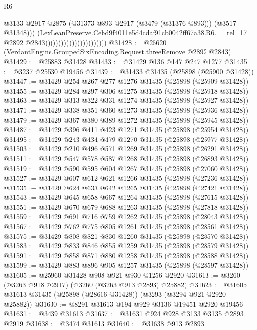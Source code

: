 \begin{lexlean}{R6}
\begin{coremodule}
                                                    @3133
                                                    @2917
                                                    @2875
                                                    (@31373 @893 @2917 (@3479 (@31376 @893)))
                                                    (@3517 @31348)))
                                                (LexLeanPreserve.Cebd9f4011e5d4cdaf91cb0042ff67a38.R6.__rel_17
                                                  @2892
                                                  @2843)))))))))))))))))))))))
@31428 := @25620 (VerdantEngine.GroupedSixEncoding.Request.threeRemove @2892 @2843)
@31429 := @25883 @31428
@31433 := @31429 @136 @147 @247 @1277
@31435 := @3237 @25530 @19456
@31439 := @31433 @31435 (@25898 (@25900 @31428))
@31447 := @31429 @254 @267 @277 @1276 @31435 (@25898 (@25909 @31428))
@31455 := @31429 @284 @297 @306 @1275 @31435 (@25898 (@25918 @31428))
@31463 := @31429 @313 @322 @331 @1274 @31435 (@25898 (@25927 @31428))
@31471 := @31429 @338 @351 @360 @1273 @31435 (@25898 (@25936 @31428))
@31479 := @31429 @367 @380 @389 @1272 @31435 (@25898 (@25945 @31428))
@31487 := @31429 @396 @411 @423 @1271 @31435 (@25898 (@25954 @31428))
@31495 := @31429 @243 @434 @479 @1270 @31435 (@25898 (@25977 @31428))
@31503 := @31429 @210 @496 @571 @1269 @31435 (@25898 (@26291 @31428))
@31511 := @31429 @547 @578 @587 @1268 @31435 (@25898 (@26893 @31428))
@31519 := @31429 @590 @595 @604 @1267 @31435 (@25898 (@27060 @31428))
@31527 := @31429 @607 @612 @621 @1266 @31435 (@25898 (@27236 @31428))
@31535 := @31429 @624 @633 @642 @1265 @31435 (@25898 (@27421 @31428))
@31543 := @31429 @645 @658 @667 @1264 @31435 (@25898 (@27615 @31428))
@31551 := @31429 @670 @679 @688 @1263 @31435 (@25898 (@27818 @31428))
@31559 := @31429 @691 @716 @759 @1262 @31435 (@25898 (@28043 @31428))
@31567 := @31429 @762 @775 @805 @1261 @31435 (@25898 (@28561 @31428))
@31575 := @31429 @808 @821 @830 @1260 @31435 (@25898 (@28570 @31428))
@31583 := @31429 @833 @846 @855 @1259 @31435 (@25898 (@28579 @31428))
@31591 := @31429 @858 @871 @880 @1258 @31435 (@25898 (@28588 @31428))
@31599 := @31429 @883 @896 @905 @1257 @31435 (@25898 (@28597 @31428))
@31605 := @25960 @31428 @908 @921 @930 @1256 @2920
@31613 := @3260 (@3263 @918 @2917) (@3260 (@3263 @913 @2893) @25882)
@31623 := @31605 @31613 @31435 (@25898 (@28606 @31428)) (@3293 (@3294 @921 @2920 @25882))
@31630 := @8291 @31613 @194 @929 @3136 @19451 @2920 @19456
@31631 := @3439 @31613
@31637 := @31631 @924 @928 @3133 @3135 @2893 @2919
@31638 := @3474 @31613
@31640 := @31638 @913 @2893

\end{coremodule}
\end{lexlean}
